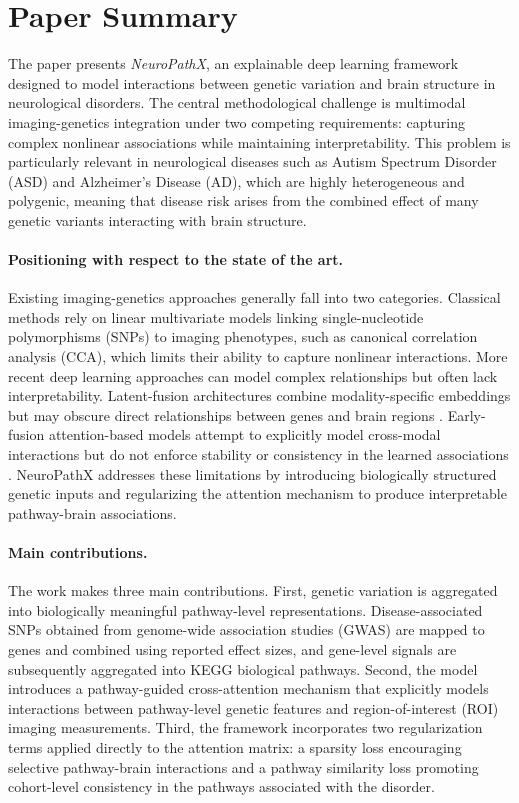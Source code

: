 \section{Paper Summary}

The paper presents \textit{NeuroPathX}\cite{wang2024neuropathx}, an explainable deep learning framework designed to model interactions between genetic variation and brain structure in neurological disorders. The central methodological challenge is multimodal imaging-genetics integration under two competing requirements: capturing complex nonlinear associations while maintaining interpretability. This problem is particularly relevant in neurological diseases such as Autism Spectrum Disorder (ASD) and Alzheimer's Disease (AD), which are highly heterogeneous and polygenic, meaning that disease risk arises from the combined effect of many genetic variants interacting with brain structure.

\paragraph{Positioning with respect to the state of the art.}
Existing imaging-genetics approaches generally fall into two categories. Classical methods rely on linear multivariate models linking single-nucleotide polymorphisms (SNPs) to imaging phenotypes, such as canonical correlation analysis (CCA), which limits their ability to capture nonlinear interactions. More recent deep learning approaches can model complex relationships but often lack interpretability. Latent-fusion architectures combine modality-specific embeddings but may obscure direct relationships between genes and brain regions \cite{ghosal2021gmind}. Early-fusion attention-based models attempt to explicitly model cross-modal interactions but do not enforce stability or consistency in the learned associations \cite{jaume2024survpath}. NeuroPathX addresses these limitations by introducing biologically structured genetic inputs and regularizing the attention mechanism to produce interpretable pathway-brain associations.

\paragraph{Main contributions.}
The work makes three main contributions. First, genetic variation is aggregated into biologically meaningful pathway-level representations. Disease-associated SNPs obtained from genome-wide association studies (GWAS) are mapped to genes and combined using reported effect sizes, and gene-level signals are subsequently aggregated into KEGG biological pathways. Second, the model introduces a pathway-guided cross-attention mechanism that explicitly models interactions between pathway-level genetic features and region-of-interest (ROI) imaging measurements. Third, the framework incorporates two regularization terms applied directly to the attention matrix: a sparsity loss encouraging selective pathway-brain interactions and a pathway similarity loss promoting cohort-level consistency in the pathways associated with the disorder.


